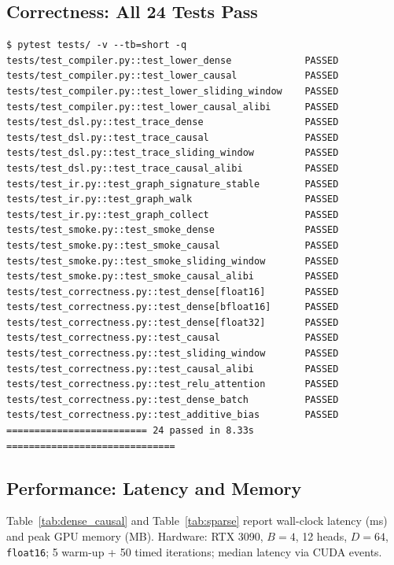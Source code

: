 \documentclass[12pt]{article}
\begin{document}
\subsection{Correctness: All 24 Tests Pass}

\begin{lstlisting}[style=terminal,
  caption={Full pytest run (RTX 3090, CUDA 12.1, Triton 3.1).}]
$ pytest tests/ -v --tb=short -q
tests/test_compiler.py::test_lower_dense             PASSED
tests/test_compiler.py::test_lower_causal            PASSED
tests/test_compiler.py::test_lower_sliding_window    PASSED
tests/test_compiler.py::test_lower_causal_alibi      PASSED
tests/test_dsl.py::test_trace_dense                  PASSED
tests/test_dsl.py::test_trace_causal                 PASSED
tests/test_dsl.py::test_trace_sliding_window         PASSED
tests/test_dsl.py::test_trace_causal_alibi           PASSED
tests/test_ir.py::test_graph_signature_stable        PASSED
tests/test_ir.py::test_graph_walk                    PASSED
tests/test_ir.py::test_graph_collect                 PASSED
tests/test_smoke.py::test_smoke_dense                PASSED
tests/test_smoke.py::test_smoke_causal               PASSED
tests/test_smoke.py::test_smoke_sliding_window       PASSED
tests/test_smoke.py::test_smoke_causal_alibi         PASSED
tests/test_correctness.py::test_dense[float16]       PASSED
tests/test_correctness.py::test_dense[bfloat16]      PASSED
tests/test_correctness.py::test_dense[float32]       PASSED
tests/test_correctness.py::test_causal               PASSED
tests/test_correctness.py::test_sliding_window       PASSED
tests/test_correctness.py::test_causal_alibi         PASSED
tests/test_correctness.py::test_relu_attention       PASSED
tests/test_correctness.py::test_dense_batch          PASSED
tests/test_correctness.py::test_additive_bias        PASSED
========================= 24 passed in 8.33s ==============================
\end{lstlisting}

\subsection{Performance: Latency and Memory}

Table~\ref{tab:dense_causal} and Table~\ref{tab:sparse} report wall-clock
latency (ms) and peak GPU memory (MB).  Hardware: RTX 3090, $B{=}4$, 12
heads, $D{=}64$, \texttt{float16}; 5 warm-up + 50 timed iterations; median
latency via CUDA events.
\end{document}
